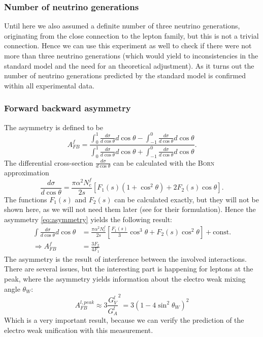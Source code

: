 \subsubsection{Number of neutrino generations}
\label{sub:number_of_neutrino_generations}
Until here we also assumed a definite number of three neutrino generations, originating from the close connection to the
lepton family, but this is not a trivial connection. Hence we can use this experiment as well to check if there were not
more than three neutrino generations (which would yield to inconsistencies in the standard model and the need for an theoretical
adjustment). As it turns out the number of neutrino generations predicted by the standard model is confirmed within all 
experimental data.

\subsubsection{Forward backward asymmetry}
\label{sub:forward_backward_asymmetry}
The asymmetry is defined to be
\begin{equation}
    \label{eq:asymmetry}
    A^f_{FB} = \frac{\int_0^1 \frac{d\sigma}{d\cos \theta}d\cos \theta - \int_{-1}^0 \frac{d\sigma}{d\cos \theta}d\cos \theta
        }{\int_0^1 \frac{d\sigma}{d\cos \theta}d\cos \theta 
    + \int_{-1}^0 \frac{d\sigma}{d\cos \theta}d\cos \theta}.
\end{equation}
The differential cross-section $\frac{d\sigma}{d\cos \theta}$ can be calculated with the \textsc{Born} approximation
\begin{equation}
    \frac{d\sigma}{d\cos \theta} = \frac{\pi \alpha^2 N_c^f}{2s} \left[ F_1(s) (1 + \cos^2 \theta) + 2 F_2(s) \cos\theta \right].
\end{equation}
The functions $F_1(s)$ and $F_2(s)$ can be calculated exactly, but they will not be shown here, as we will not need them
later (see \cite{ver} for their formulation). Hence the asymmetry \eqref{eq:asymmetry} yields the following result:
    \begin{align*}
        \label{eq:afb}
        \int \frac{d\sigma}{d\cos \theta}d\cos \theta &= \frac{\pi \alpha^2 N_c^f}{2s} 
        \left[ \frac{F_1(s)}{3} \cos^3 \theta + F_2(s) \cos^2\theta \right] + \mathrm{const}. \\
    \Rightarrow A_{FB}^f &= \frac{3 F_2}{4 F_1}
    \end{align*}
The asymmetry is the result of interference between the involved interactions. There are several issues, but the interesting
part is happening for leptons at the peak, where the asymmetry yields information about the electro weak mixing angle $\theta_W$:
\begin{equation}
    A_{FB}^{l,peak} \approx 3 \frac{G_V^l}{G_A^l}^2 = 3 ( 1 - 4 \sin^2 \theta_W ) ^2
\end{equation}
Which is a very important result, because we can verify the prediction of the electro weak unification with this measurement.
